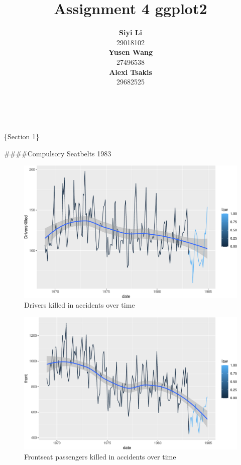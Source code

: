 \documentclass[11pt,a4paper,]{article}
\title{Assignment 4 ggplot2}
\author{\sf\Large\textbf{ Siyi Li}\\ {\sf\large 29018102\\[0.5cm]} \sf\Large\textbf{ Yusen Wang}\\ {\sf\large 27496538\\[0.5cm]} \sf\Large\textbf{ Alexi Tsakis}\\ {\sf\large 29682525\\[0.5cm]}}
\date{\sf\Date~\Month~\Year}
\makeatletter
\def\titlepage{\front{\expandafter{\@title}}{\@author}{\@organization}}
\makeatother
\begin{document}
\titlepage

\{Section 1\}

\#\#\#\#Compulsory Seatbelts 1983

\begin{figure}
\centering
\includegraphics{report_files/figure-latex/DriversKilled-1.pdf}
\caption{\label{fig:DriversKilled}Drivers killed in accidents over time}
\end{figure}

\begin{figure}
\centering
\includegraphics{report_files/figure-latex/FrontKilled-1.pdf}
\caption{\label{fig:FrontKilled}Frontseat passengers killed in accidents over time}
\end{figure}
\end{document}
